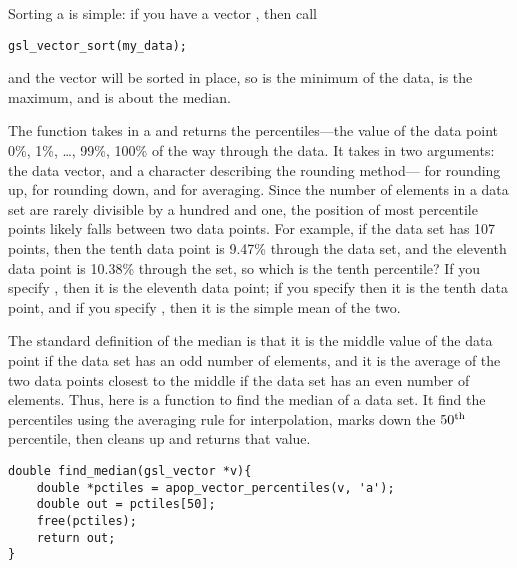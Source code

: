 Sorting  a  is 
simple: if you have a vector , then call
\begin{lstlisting}
gsl_vector_sort(my_data);
\end{lstlisting}
and the vector will be sorted in place, so
 is the minimum of the data,
 is the maximum, and 
 is about the median.

The function  takes in a
 and returns the percentiles---the value of the
data point 0\%, 1\%, \dots, 99\%, 100\% of the way through the data.
It takes in two arguments: the data vector, and a character describing
the rounding method--- for rounding up,  for rounding
down, and  for averaging. Since the number of elements in a
data set are rarely divisible by a hundred and one, the position of most
percentile points likely falls between two data points. For example, if
the data set has 107 points, then the tenth data point is 9.47\% through
the data set, and the eleventh data point is 10.38\% through the set, so
which is the tenth percentile? If you specify , then it is the
eleventh data point; if you specify  then it is the tenth data
point, and if you specify , then it is the simple mean of the two.

The standard definition of the median is that it is the middle
value of the data point if the data set has an odd number of elements,
and it is the average of the two data points closest to the middle if
the data set has an even number of elements. 
Thus, here is a function to find the median of a data set. It find the
percentiles using the averaging rule for interpolation, marks down the
$50^{\rm th}$ percentile, then cleans up and returns that value.
\begin{lstlisting}
double find_median(gsl_vector *v){
    double *pctiles = apop_vector_percentiles(v, 'a');
    double out = pctiles[50];
    free(pctiles);
    return out;
}
\end{lstlisting}




